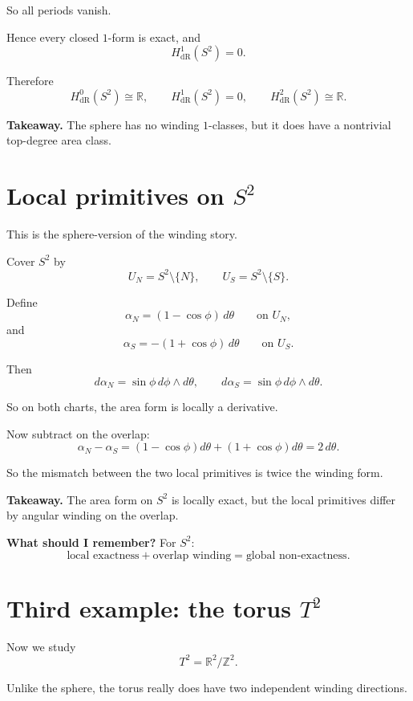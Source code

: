 \documentclass[11pt]{article}
\newenvironment{takeaway}
{\begin{framed}\noindent\textbf{Takeaway. }}
{\end{framed}}
\newenvironment{remember}
{\begin{framed}\noindent\textbf{What should I remember? }}
{\end{framed}}
\begin{document}
So all periods vanish.

Hence every closed \(1\)-form is exact, and
\[
H^1_{\mathrm{dR}}(S^2)=0.
\]

Therefore
\[
H^0_{\mathrm{dR}}(S^2)\cong\mathbb{R},\qquad
H^1_{\mathrm{dR}}(S^2)=0,\qquad
H^2_{\mathrm{dR}}(S^2)\cong\mathbb{R}.
\]

\begin{takeaway}
The sphere has no winding \(1\)-classes, but it does have a nontrivial top-degree area class.
\end{takeaway}

\section{Local primitives on \(S^2\)}

This is the sphere-version of the winding story.

Cover \(S^2\) by
\[
U_N=S^2\setminus\{N\},\qquad
U_S=S^2\setminus\{S\}.
\]

Define
\[
\alpha_N=(1-\cos\phi)\,d\theta
\qquad\text{on }U_N,
\]
and
\[
\alpha_S=-(1+\cos\phi)\,d\theta
\qquad\text{on }U_S.
\]

Then
\[
d\alpha_N=\sin\phi\,d\phi\wedge d\theta,
\qquad
d\alpha_S=\sin\phi\,d\phi\wedge d\theta.
\]

So on both charts, the area form is locally a derivative.

Now subtract on the overlap:
\[
\alpha_N-\alpha_S
=
(1-\cos\phi)d\theta+(1+\cos\phi)d\theta
=
2\,d\theta.
\]

So the mismatch between the two local primitives is twice the winding form.

\begin{takeaway}
The area form on \(S^2\) is locally exact, but the local primitives differ by angular winding on the overlap.
\end{takeaway}

\begin{remember}
For \(S^2\):
\[
\text{local exactness} + \text{overlap winding} = \text{global non-exactness}.
\]
\end{remember}

\section{Third example: the torus \(T^2\)}

Now we study
\[
T^2=\mathbb{R}^2/\mathbb{Z}^2.
\]

Unlike the sphere, the torus really does have two independent winding directions.
\end{document}
